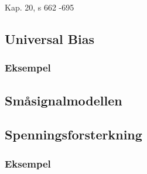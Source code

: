 Kap. 20, s 662 -695

\subsection{Universal Bias}
  
  \subsubsection{Eksempel}
    

\subsection{Småsignalmodellen}
  

\subsection{Spenningsforsterkning}
  
  \subsubsection{Eksempel}
    
